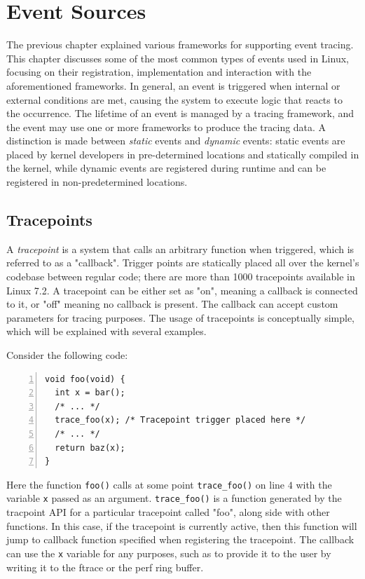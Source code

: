 \chapter{Event Sources}

The previous chapter explained various frameworks for supporting event tracing.
This chapter discusses some of the most common types of events used in Linux,
focusing on their registration, implementation and interaction with the
aforementioned frameworks. In general, an event is triggered when internal or
external conditions are met, causing the system to execute logic that reacts to
the occurrence. The lifetime of an event is managed by a tracing framework, and
the event may use one or more frameworks to produce the tracing data. A
distinction is made between \textit{static} events and \textit{dynamic} events:
static events are placed by kernel developers in pre-determined locations and
statically compiled in the kernel, while dynamic events are registered during
runtime and can be registered in non-predetermined locations.

\section{Tracepoints}

A \textit{tracepoint} is a system that calls an arbitrary function when
triggered, which is referred to as a "callback". Trigger points are statically
placed all over the kernel's codebase between regular code; there are more than
1000 tracepoints available in Linux 7.2. A tracepoint can be either set as "on",
meaning a callback is connected to it, or "off" meaning no callback is present.
The callback can accept custom parameters for tracing purposes. The usage of
tracepoints is conceptually simple, which will be explained with several
examples.

Consider the following code:

\begin{Verbatim}[numbers=left, numbersep=5pt, frame=single]
void foo(void) {
  int x = bar();
  /* ... */
  trace_foo(x); /* Tracepoint trigger placed here */
  /* ... */
  return baz(x);
}
\end{Verbatim}

Here the function \verb|foo()| calls at some point \verb|trace_foo()| on line
$4$ with the variable \verb|x| passed as an argument. \verb|trace_foo()| is a
function generated by the tracpoint API for a particular tracepoint called
"foo", along side with other functions. In this case, if the tracepoint is
currently active, then this function will jump to callback function specified
when registering the tracepoint. The callback can use the \verb|x| variable for
any purposes, such as to provide it to the user by writing it to the ftrace or
the perf ring buffer.

